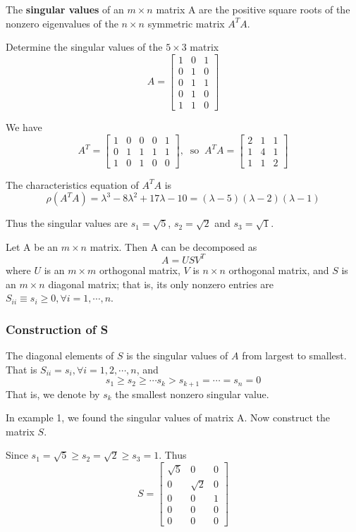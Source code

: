 \begin{definition}
	The \textbf{singular values} of an $m \times n$ matrix A are the positive square roots of the nonzero eigenvalues of the $n \times n$ symmetric matrix $A^TA$.
\end{definition}
\begin{ex}
	Determine the singular values of the $5 \times 3$ matrix
	\[ A = \begin{bmatrix}
	1&0&1\\ 0&1&0\\ 0&1&1\\ 0&1&0\\ 1&1&0
	\end{bmatrix} \]
	\begin{solution}
		We have
		\[ A^T = \begin{bmatrix}
		1&0&0&0&1\\ 0&1&1&1&1\\ 1&0&1&0&0
		\end{bmatrix},\;\; \text{so}\;\; 
		A^TA = \begin{bmatrix}
		2&1&1\\ 1&4&1\\ 1&1&2
		\end{bmatrix} \]
		
		The characteristics equation of $A^TA$ is
		\[ \rho(A^TA) = \lambda^3 - 8\lambda^2 + 17\lambda - 10 = (\lambda - 5)(\lambda - 2)(\lambda - 1) \]
		
		Thus the singular values are $s_1 = \sqrt{5}$, $s_2 = \sqrt{2}$ and $s_3=\sqrt{1}$. 
	\end{solution}
\end{ex}
\begin{thm}
	Let A be an $m\times n$ matrix. Then A can be decomposed as
	\[ A = USV^T \]
	where $U$ is an $m\times m$ orthogonal matrix, $V$ is $n\times n$ orthogonal matrix, and $S$ is an $m\times n$ diagonal matrix; that is, its only nonzero entries are $S_{ii} \equiv s_i \geq 0,\forall i = 1,\cdots , n$. 
\end{thm}
\subsubsection*{Construction of S}
The diagonal elements of $S$ is the singular values of $A$ from largest to smallest. That is $S_{ii} = s_i, \forall i=1,2,\cdots, n$, and
\[s_1 \geq s_2 \geq \cdots s_k > s_{k+1} = \cdots = s_n = 0\]
That is, we denote by $s_k$ the smallest nonzero singular value.

\begin{ex}
	In example 1, we found the singular values of matrix A. Now construct the matrix $S$.
	\begin{solution}
		Since $s_1 = \sqrt{5} \geq s_2 = \sqrt{2} \geq s_3 = 1$. Thus
		\[ S = \begin{bmatrix}
		\sqrt{5}&0&0\\ 0&\sqrt{2}&0\\ 0&0&1\\ 0&0&0\\ 0&0&0
		\end{bmatrix} \]
	\end{solution}
\end{ex} 

